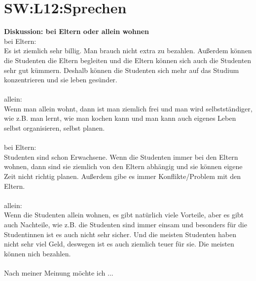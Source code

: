 \section{SW:L12:Sprechen}
\noindent
\textbf{Diskussion: bei Eltern oder allein wohnen} \\
bei Eltern: \\
Es ist ziemlich sehr billig. Man brauch nicht extra zu bezahlen.
Außerdem können die Studenten die Eltern begleiten und
die Eltern können sich auch die Studenten sehr gut kümmern.
Deshalb können die Studenten sich mehr auf das Studium konzentrieren und sie leben gesünder. \\
\\
\noindent
allein: \\
Wenn man allein wohnt, dann ist man ziemlich frei und
man wird selbstständiger, wie z.B.
man lernt, wie man kochen kann und
man kann auch eigenes Leben selbst organisieren, selbst planen. \\
\\
\noindent
bei Eltern: \\
Studenten sind schon Erwachsene.
Wenn die Studenten immer bei den Eltern wohnen,
dann sind sie ziemlich von den Eltern abhängig und
sie können eigene Zeit nicht richtig planen.
Außerdem gibe es immer Konflikte/Problem mit den Eltern. \\
\\
\noindent
allein: \\
Wenn die Studenten allein wohnen,
es gibt natürlich viele Vorteile, aber es gibt auch Nachteile,
wie z.B. die Studenten sind immer einsam und
besonders für die Studentinnen ist es auch nicht sehr sicher.
Und die meisten Studenten haben nicht sehr viel Geld,
deswegen ist es auch ziemlich teuer für sie.
Die meisten können nich bezahlen. \\
\\
\noindent
Nach meiner Meinung möchte ich ...

